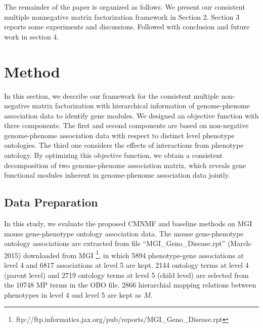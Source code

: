 \documentclass{bmcart}
\begin{document}
The remainder of the paper is organized as follows. We present our consistent multiple nonnegative matrix factorization framework in Section 2. Section 3 reports some experiments and discussions. Followed with conclusion and future work in section 4.


\section*{Method}
In this section, we describe our framework for the consistent multiple non-negative matrix
factorization with hierarchical information of genome-phenome association data to identify gene modules.
We designed an objective function with three components. The first and second components are based on non-negative genome-phenome association data with respect to distinct level phenotype ontologies. The third one considers the effects of interactions from phenotype ontology. By optimizing this objective function, we obtain a consistent decomposition of two genome-phenome association matrix, which reveals gene functional modules inherent in genome-phenome association data jointly.

\subsection*{\textbf{Data Preparation}}
In this study, we evaluate the proposed CMNMF and baseline methods on MGI mouse gene-phenotype ontology association data. The mouse gene-phenotype ontology associations are extracted from file ``MGI\_Geno\_Disease.rpt'' (March-2015) downloaded from MGI \footnote[1]{ftp://ftp.informatics.jax.org/pub/reports/MGI\_Geno\_Disease.rpt}, in which 5894 phenotype-gene associations at level 4 and 6817 associations at level 5 are kept. 2144 ontology terms at level 4 (parent level) and 2719 ontology terms at level 5 (child level)  are selected from the 10748 MP terms in the OBO file. 2866 hierarchial mapping relations between phenotypes in level 4 and level 5 are kept as $M$.
\end{document}
